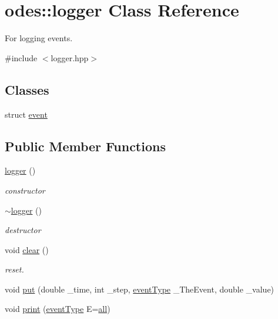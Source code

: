 \hypertarget{classodes_1_1logger}{\section{odes\-:\-:logger Class Reference}
\label{classodes_1_1logger}
}


For logging events.  




{\ttfamily \#include $<$logger.\-hpp$>$}

\subsection*{Classes}
\begin{DoxyCompactItemize}
\item 
struct \hyperlink{structodes_1_1logger_1_1event}{event}
\end{DoxyCompactItemize}
\subsection*{Public Member Functions}
\begin{DoxyCompactItemize}
\item 
\hyperlink{classodes_1_1logger_a3c47645a906192af7e25a361291c0300}{logger} ()
\begin{DoxyCompactList}\small\item\em constructor \end{DoxyCompactList}\item 
\hyperlink{classodes_1_1logger_ab6deee9d915c1a6886b6c8c64fe7d867}{$\sim$logger} ()
\begin{DoxyCompactList}\small\item\em destructor \end{DoxyCompactList}\item 
void \hyperlink{classodes_1_1logger_a69c44a6b2f05e295a12a5d198e53f01c}{clear} ()
\begin{DoxyCompactList}\small\item\em reset. \end{DoxyCompactList}\item 
void \hyperlink{classodes_1_1logger_a2ff83aa375931c2e8aab3aaa3ec11d4a}{put} (double \-\_\-time, int \-\_\-step, \hyperlink{namespaceodes_a0e9924dcd4d2b0cedc36ec2eff4dcba8}{event\-Type} \-\_\-\-The\-Event, double \-\_\-value)
\item 
void \hyperlink{classodes_1_1logger_aaf2cd1d57a8190351882fa54fd9ae15f}{print} (\hyperlink{namespaceodes_a0e9924dcd4d2b0cedc36ec2eff4dcba8}{event\-Type} E=\hyperlink{namespaceodes_a0e9924dcd4d2b0cedc36ec2eff4dcba8ad985883a2a443d3b103d6b312caefef2}{all})
\end{DoxyCompactItemize}

